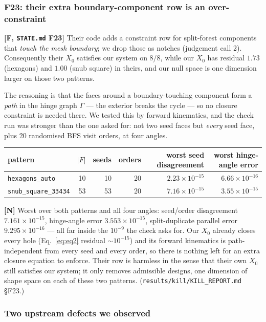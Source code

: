 \documentclass[11pt,a4paper]{article}
\theoremstyle{definition}
\newcommand{\file}[1]{\texttt{\small #1}}
\begin{document}
\subsubsection*{F23: their extra boundary-component row is an over-constraint}

\textbf{[F, \file{STATE.md} F23]} Their code adds a constraint row for split-forest
components that \emph{touch the mesh boundary}; we drop those as notches (judgement call 2).
Consequently their $X_0$ satisfies our system on 8/8, while our $X_0$ has residual $1.73$
(hexagons) and $1.00$ (snub square) in theirs, and our null space is one dimension larger on
those two patterns.

The reasoning is that the faces around a boundary-touching component form a \emph{path} in
the hinge graph $\Gamma$ --- the exterior breaks the cycle --- so no closure constraint is
needed there. We tested this by forward kinematics, and the check run was stronger than the
one asked for: not two seed faces but \emph{every} seed face, plus 20 randomised BFS visit
orders, at four angles.

\begin{center}
\small
\begin{tabular}{@{}lrrrrr@{}}
\toprule
pattern & $|F|$ & seeds & orders & worst seed disagreement & worst hinge-angle error \\
\midrule
\file{hexagons\_auto} & 10 & 10 & 20 & $2.23\times10^{-15}$ & $6.66\times10^{-16}$ \\
\file{snub\_square\_33434} & 53 & 53 & 20 & $7.16\times10^{-15}$ & $3.55\times10^{-15}$ \\
\bottomrule
\end{tabular}
\end{center}

\noindent
\textbf{[N]} Worst over both patterns and all four angles: seed/order disagreement
$7.161\times10^{-15}$, hinge-angle error $3.553\times10^{-15}$, split-duplicate parallel
error $9.295\times10^{-16}$ --- all far inside the $10^{-9}$ the check asks for. Our $X_0$
already closes every hole (Eq.~\eqref{eq:eq2} residual $\sim10^{-15}$) and its forward
kinematics is path-independent from every seed and every order, so there is nothing left for
an extra closure equation to enforce. Their row is harmless in the sense that their own $X_0$
still satisfies our system; it only removes admissible designs, one dimension of shape space
on each of these two patterns. (\file{results/kill/KILL\_REPORT.md} §F23.)

\subsubsection*{Two upstream defects we observed}
\end{document}
